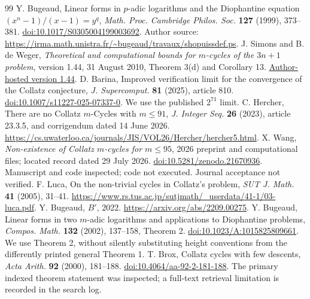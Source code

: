 \documentclass[11pt]{article}
\theoremstyle{definition}\newtheorem{definition}[theorem]{Definition}
\begin{document}
\begin{thebibliography}{99}
 Y. Bugeaud, Linear forms in $p$-adic logarithms and the Diophantine equation $(x^n-1)/(x-1)=y^q$, \emph{Math. Proc. Cambridge Philos. Soc.} \textbf{127} (1999), 373--381. \href{https://doi.org/10.1017/S0305004199003692}{doi:10.1017/S0305004199003692}. Author source: \url{https://irma.math.unistra.fr/~bugeaud/travaux/shopuissdef.ps}.
 J. Simons and B. de Weger, \emph{Theoretical and computational bounds for $m$-cycles of the $3n+1$ problem}, version 1.44, 31 August 2010, Theorem 3(d) and Corollary 13. \href{https://math.deweger.net/papers/\%5B35a\%5DSidW-3n\%2B1-v1.44\%5B2010\%5D.pdf}{Author-hosted version 1.44}.
 D. Barina, Improved verification limit for the convergence of the Collatz conjecture, \emph{J. Supercomput.} \textbf{81} (2025), article 810. \href{https://doi.org/10.1007/s11227-025-07337-0}{doi:10.1007/s11227-025-07337-0}. We use the published $2^{71}$ limit.
 C. Hercher, There are no Collatz $m$-Cycles with $m\le91$, \emph{J. Integer Seq.} \textbf{26} (2023), article 23.3.5, and corrigendum dated 14 June 2026. \url{https://cs.uwaterloo.ca/journals/JIS/VOL26/Hercher/hercher5.html}.
 X. Wang, \emph{Non-existence of Collatz $m$-cycles for $m\le95$}, 2026 preprint and computational files; located record dated 29 July 2026. \href{https://doi.org/10.5281/zenodo.21670936}{doi:10.5281/zenodo.21670936}. Manuscript and code inspected; code not executed. Journal acceptance not verified.
 F. Luca, On the non-trivial cycles in Collatz's problem, \emph{SUT J. Math.} \textbf{41} (2005), 31--41. \url{https://www.rs.tus.ac.jp/sutjmath/_userdata/41-1/03-luca.pdf}.
 Y. Bugeaud, \emph{$B'$}, 2022. \url{https://arxiv.org/abs/2209.00275}.
 Y. Bugeaud, Linear forms in two $m$-adic logarithms and applications to Diophantine problems, \emph{Compos. Math.} \textbf{132} (2002), 137--158, Theorem 2. \href{https://doi.org/10.1023/A:1015825809661}{doi:10.1023/A:1015825809661}. We use Theorem 2, without silently substituting height conventions from the differently printed general Theorem 1.
 T. Brox, Collatz cycles with few descents, \emph{Acta Arith.} \textbf{92} (2000), 181--188. \href{https://doi.org/10.4064/aa-92-2-181-188}{doi:10.4064/aa-92-2-181-188}. The primary indexed theorem statement was inspected; a full-text retrieval limitation is recorded in the search log.
\end{thebibliography}
\end{document}
